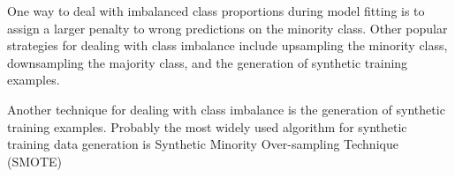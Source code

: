 One way to deal with imbalanced class proportions during model fitting is to assign a larger penalty to wrong predictions on the minority class. Other popular strategies for dealing with class imbalance include upsampling the minority class, downsampling the majority class, and the generation of synthetic training examples.

\begin{tcolorbox}[title=Generating new training data to address class imbalance]
    Another technique for dealing with class imbalance is the generation of synthetic training examples. Probably the most widely used algorithm for synthetic training data generation is Synthetic Minority Over-sampling Technique (SMOTE)
\end{tcolorbox}